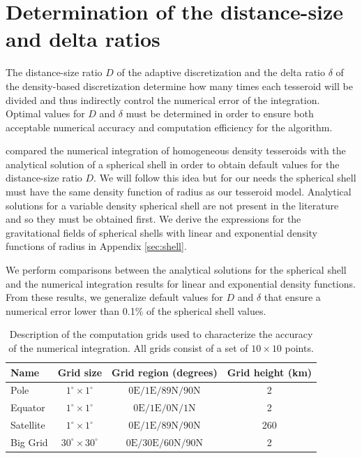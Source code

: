 \documentclass[extra, referee]{gji}
\begin{document}

\section{Determination of the distance-size and delta ratios}

The distance-size ratio $D$ of the adaptive discretization and the delta ratio $\delta$
of the density-based discretization determine how many times each tesseroid will be
divided and thus indirectly control the numerical error of the integration.
Optimal values for $D$ and $\delta$ must be determined in order to ensure both
acceptable numerical accuracy and computation efficiency for the algorithm.

\citet{Uieda2016} compared the numerical integration of homogeneous density tesseroids
with the analytical solution of a spherical shell \citep{Mikuska2006,Grombein2013} in
order to obtain default values for the distance-size ratio $D$.
We will follow this idea but for our needs the spherical shell must
have the same density function of radius as our tesseroid model.
Analytical solutions for a variable density spherical shell are not present in the
literature and so they must be obtained first.
We derive the expressions for the gravitational fields of spherical shells with linear
and exponential density functions of radius in Appendix \ref{sec:shell}.

We perform comparisons between the analytical solutions for the spherical shell and the
numerical integration results for linear and exponential density functions.
From these results, we generalize default values for $D$ and $\delta$ that ensure a
numerical error lower than 0.1\% of the spherical shell values.

\begin{table}
\caption{
    Description of the computation grids used to characterize the accuracy of the
    numerical integration.
    All grids consist of a set of $10 \times 10$ points.
}
\label{tab:grids}
\begin{tabular}{lccc}
    Name & Grid size & Grid region (degrees) & Grid height (km)
    \\ \hline
    Pole & $1^\circ \times 1^\circ$ & $0\text{E}/1\text{E}/89\text{N}/90\text{N}$ & 2 \\
    Equator & $1^\circ \times 1^\circ$ & $0\text{E}/1\text{E}/0\text{N}/1\text{N}$ & 2 \\
    Satellite & $1^\circ \times 1^\circ$ & $0\text{E}/1\text{E}/89\text{N}/90\text{N}$ & 260 \\
    Big Grid & $30^\circ \times 30^\circ$ & $0\text{E}/30\text{E}/60\text{N}/90\text{N}$ & 2 \\
\end{tabular}
\end{table}
\end{document}
